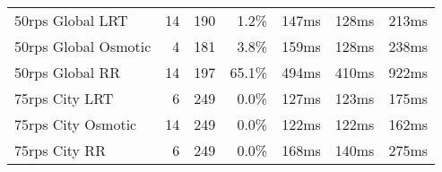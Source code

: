 \begin{table}[]
\begin{tabular}{lrrrrrr}
50rps Global LRT     & 14                                                             & 190                                                                                       & 1.2\%                                                                         & 147ms                                                       & 128ms                                                         & 213ms                                                      \\
50rps Global Osmotic & 4                                                              & 181                                                                                       & 3.8\%                                                                         & 159ms                                                       & 128ms                                                         & 238ms                                                      \\
50rps Global RR      & 14                                                             & 197                                                                                       & 65.1\%                                                                        & 494ms                                                       & 410ms                                                         & 922ms                                                      \\ \hline
75rps City LRT       & 6                                                              & 249                                                                                       & 0.0\%                                                                         & 127ms                                                       & 123ms                                                         & 175ms                                                      \\
75rps City Osmotic   & 14                                                             & 249                                                                                       & 0.0\%                                                                         & 122ms                                                       & 122ms                                                         & 162ms                                                      \\
75rps City RR        & 6                                                              & 249                                                                                       & 0.0\%                                                                         & 168ms                                                       & 140ms                                                         & 275ms                                                      \\ \hline

\end{tabular}
\end{table}
